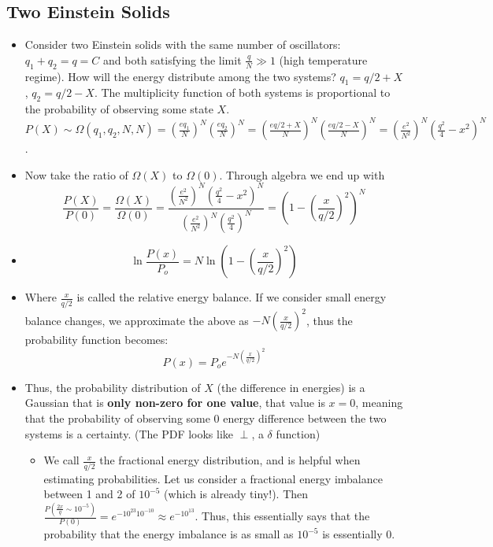 \documentclass[8pt]{article}
\begin{document}
\subsection{Two Einstein Solids}
\begin{itemize}
    \item Consider two Einstein solids with the same number of oscillators: $q_1 + q_2 = q = C$ and both satisfying the limit $\frac{q}{N} \gg 1$ (high temperature regime).  How will the energy distribute among the two systems? $q_1 = q/2 + X$, $q_2 = q/2 - X$. The multiplicity function of both systems is proportional to the probability of observing some state $X$. $P(X) \sim \Omega (q_1, q_2, N, N) = (\frac{e q_1}{N})^N (\frac{e q_2}{N})^N = (\frac{e q/2 + X}{N})^N (\frac{e q/2 - X}{N})^N = (\frac{e^2}{N^2})^N (\frac{q^2}{4} - x^2)^N$. 
    \item Now take the ratio of $\Omega(X)$ to $\Omega(0)$. Through algebra we end up with \begin{equation}
        \frac{P(X)}{P(0)} = \frac{\Omega(X)}{\Omega(0)}= \frac{(\frac{e^2}{N^2})^N (\frac{q^2}{4} - x^2)^N}{(\frac{e^2}{N^2})^N (\frac{q^2}{4})^N} = \left(1- (\frac{x}{q/2})^2\right)^N  
    \end{equation}
    \item \[\ln \frac{P(x)}{P_o} = N \ln \left(1- \left(\frac{x}{q/2} \right) ^2 \right)\]
    \item Where $\frac{x}{q/2}$ is called the relative energy balance. If we consider small energy balance changes, we approximate the above as $-N \left( \frac{x}{q/2} \right)^2$, thus the probability function becomes: \[P(x) = P_o e ^{-N\left( \frac{x}{q/2} \right)^2}\]
    \item Thus, the probability distribution of $X$ (the difference in energies) is a Gaussian that is \textbf{only non-zero for one value}, that value is $x=0$, meaning that the probability of observing some $0$ energy difference between the two systems is a certainty. (The PDF looks like $\perp$, a $\delta$ function)
    \begin{itemize}
        \item We call $\frac{x}{q/2}$ the fractional energy distribution, and is helpful when estimating probabilities. Let us consider a fractional energy imbalance between 1 and 2 of $10^{-5}$ (which is already tiny!). Then $\frac{P(\frac{2x}{q} \sim 10^{-5})}{P(0)} = e^{-10^{23} 10^{-10}} \approx e^{-10^{13}}$. Thus, this essentially says that the probability that the energy imbalance is as small as $10^{-5}$ is essentially 0. 
    \end{itemize}
\end{itemize}
\end{document}
